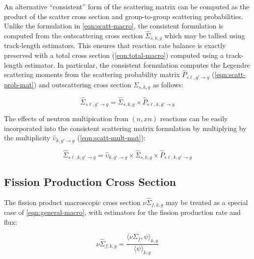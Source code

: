 An alternative ``consistent'' form of the scattering matrix can be computed as the product of the scatter cross section and group-to-group scattering probabilities. Unlike the formulation in \autoref{eqn:scatt-macro}, the consistent formulation is computed from the outscattering cross section $\hat{\Sigma}_{s,k,g}$ which may be tallied using track-length estimators. This ensures that reaction rate balance is exactly preserved with a total cross section (\autoref{eqn:total-macro}) computed using a track-length estimator. In particular, the consistent formulation computes the Legendre scattering moments from the scattering probability matrix $\hat{P}_{s\ell,g'\rightarrow g}$ (\autoref{eqn:scatt-prob-mat}) and outscattering cross section $\Sigma_{s,k,g}$ as follows:

\begin{equation}
\label{eqn:scatt-mat-consistent}
\hat{\Sigma}_{s\ell,g'\rightarrow g} = \hat{\Sigma}_{s,k,g} \times \hat{P}_{s\ell,k,g'\rightarrow g}
\end{equation}

\noindent The effects of neutron multipication from $(n,xn)$ reactions can be easily incorporated into the consistent scattering matrix formulation by multiplying by the multiplicity $\hat{\upsilon}_{k,g'\rightarrow g}$ (\autoref{eqn:scatt-mult-mat}):

\begin{equation}
\label{eqn:nuscatt-mat-consistent}
\hat{\Sigma}_{s\ell,k,g'\rightarrow g} = \hat{\upsilon}_{k,g'\rightarrow g} \times \hat{\Sigma}_{s,k,g} \times \hat{P}_{s\ell,k,g'\rightarrow g}
\end{equation}

\subsection{Fission Production Cross Section}
\label{subsubsec:tally-types-fiss-prod}

The fission product macroscopic cross section $\nu\hat{\Sigma}_{f,k,g}$ may be treated as a special case of \autoref{eqn:general-macro}, with estimators for the fission production rate and flux:

\begin{equation}
\label{eqn:nu-fiss-macro}
\nu\hat{\Sigma}_{f,k,g} = \frac{\langle \nu\Sigma_{f}, \psi \rangle_{k,g}}{\langle \psi \rangle_{k,g}}
\end{equation}

